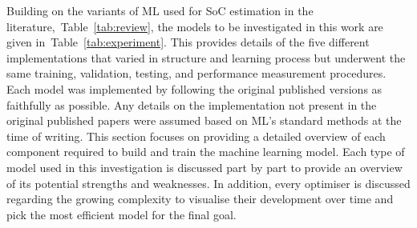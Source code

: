 %
Building on the variants of ML used for SoC estimation in the literature,~\mbox{Table~\ref{tab:review}}, the models to be investigated in this work are given in~\mbox{Table~\ref{tab:experiment}}.
This provides details of the five different implementations that varied in structure and learning process but underwent the same training, validation, testing, and performance measurement procedures.
Each model was implemented by following the original published versions as faithfully as possible.
Any details on the implementation not present in the original published papers were assumed based on ML's standard methods at the time of writing.
This section focuses on providing a detailed overview of each component required to build and train the machine learning model.
Each type of model used in this investigation is discussed part by part to provide an overview of its potential strengths and weaknesses.
In addition, every optimiser is discussed regarding the growing complexity to visualise their development over time and pick the most efficient model for the final goal.
